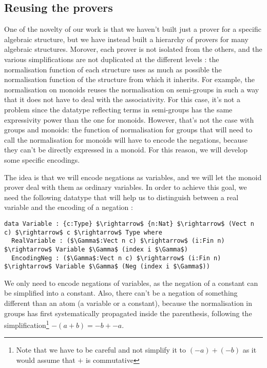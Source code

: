 \subsection{Reusing the provers}
\label{sect:reusabilityOfTheProvers}

One of the novelty of our work is that we haven't built just a prover for a specific algebraic structure, but we have instead built a hierarchy of provers for many algebraic structures. Morover, each prover is not isolated from the others, and the various simplifications are not duplicated at the different levels : the normalisation function of each structure uses as much as possible the normalisation function of the structure from which it inherits. For example, the normalisation on monoids reuses the normalisation on semi-groups in such a way that it does not have to deal with the associativity. For this case, it's not a problem since the datatype reflecting terms in semi-groups has the same expressivity power than the one for monoids. However, that's not the case with groups and monoids: the function of normalisation for groups that will need to call the normalisation for monoids will have to encode the negations, because they can't be directly expressed in a monoid. For this reason, we will develop some specific encodings.

The idea is that we will encode negations as variables, and we will let the monoid prover deal with them as ordinary variables. In order to achieve this goal, we need the following datatype that will help us to distinguish between a real variable and the encoding of a negation :

\begin{lstlisting}
data Variable : {c:Type} $\rightarrow$ {n:Nat} $\rightarrow$ (Vect n c) $\rightarrow$ c $\rightarrow$ Type where
  RealVariable : ($\Gamma$:Vect n c) $\rightarrow$ (i:Fin n) $\rightarrow$ Variable $\Gamma$ (index i $\Gamma$)
  EncodingNeg : ($\Gamma$:Vect n c) $\rightarrow$ (i:Fin n) $\rightarrow$ Variable $\Gamma$ (Neg (index i $\Gamma$))
\end{lstlisting}

We only need to encode negations of variables, as the negation of a constant can be simplified into a constant. Also, there can't be a negation of something different than an atom (a variable or a constant), because the normalisation in groups has first systematically propagated  inside the parenthesis, following the simplification\footnote{Note that we have to be careful and not simplify it to $(-a) + (-b)$ as it would assume that $+$ is commutative} $-(a+b) = -b + -a$.

